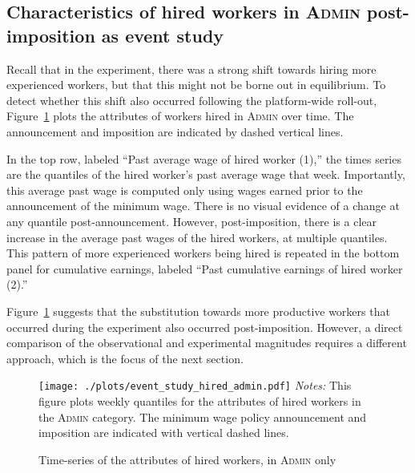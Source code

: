 \documentclass[AER]{AEA}
\newcommand{\admin}{\textsc{Admin}}
\begin{document}
\subsection{Characteristics of hired workers in \admin{} post-imposition as event study} \label{sec:post_imposition_shift}
Recall that in the experiment, there was a strong shift towards hiring more experienced workers, but that this might not be borne out in equilibrium. 
To detect whether this shift also occurred following the platform-wide roll-out, Figure~\ref{fig:event_study_hired_admin} plots the attributes of workers hired in \admin{} over time.
The announcement and imposition are indicated by dashed vertical lines.

In the top row, labeled ``Past average wage of hired worker (1),'' the times series are the quantiles of the hired worker's past average wage that week.
Importantly, this average past wage is computed only using wages earned prior to the announcement of the minimum wage.
There is no visual evidence of a change at any quantile post-announcement.
However, post-imposition, there is a clear increase in the average past wages of the hired workers, at multiple quantiles.
This pattern of more experienced workers being hired is repeated in the bottom panel for cumulative earnings, labeled ``Past cumulative earnings of hired worker (2).'' 

Figure~\ref{fig:event_study_hired_admin} suggests that the substitution towards more productive workers that occurred during the experiment also occurred post-imposition.
However, a direct comparison of the observational and experimental magnitudes requires a different approach, which is the focus of the next section. 

\begin{figure}[h!]
\centering 
\caption{Time-series of the attributes of hired workers, in \admin{} only}
\label{fig:event_study_hired_admin} 
\begin{minipage}{0.90 \linewidth}
\texttt{[image: ./plots/event\_study\_hired\_admin.pdf]} 
{\footnotesize
  \emph{Notes:} This figure plots weekly quantiles for the attributes of hired workers in the \admin{} category.
  The minimum wage policy announcement and imposition are indicated with vertical dashed lines.
}
\end{minipage} 
\end{figure} 
\end{document}
